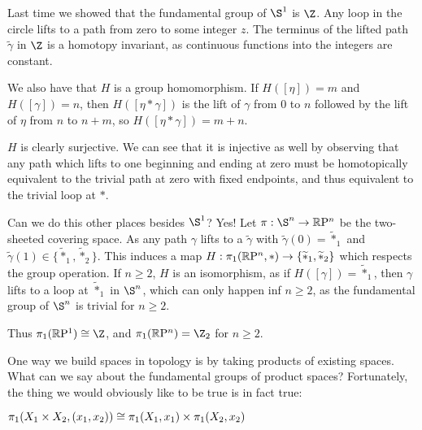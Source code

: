 
Last time we showed that the fundamental group of $\S^1$ is $\Z$.  Any loop in the circle lifts to a path from zero to some integer $z$.  The terminus of the lifted path $\widetilde{\gamma}$ in $\Z$ is a homotopy invariant, as continuous functions into the integers are constant.

	
We also have that $H$ is a group homomorphism.  If $H([\eta])=m$ and $H([\gamma])=n$, then $H([\eta\ast\gamma])$ is the lift of $\gamma$ from $0$ to $n$ followed by the lift of $\eta$ from $n$ to $n+m$, so $H([\eta\ast\gamma])=m+n$.

$H$ is clearly surjective.  We can see that it is injective as well by observing that any path which lifts to one beginning and ending at zero must be homotopically equivalent to the trivial path at zero with fixed endpoints, and thus equivalent to the trivial loop at $\ast$.

Can we do this other places besides $\S^1$? Yes!  Let $\pi:\S^n\rightarrow \RP^n$ be the two-sheeted covering space.  As any path $\gamma$ lifts to a $\widetilde{\gamma}$ with $\widetilde{\gamma}(0)=\widetilde{\ast}_1$ and $\widetilde{\gamma}(1)\in\{\widetilde{\ast}_1,\widetilde{\ast}_2\}$.  This induces a map $H:\pi_1(\mathbb{R}\mathrm{P}^n,\ast)\rightarrow\{\widetilde{\ast}_1,\widetilde{\ast}_2\}$ which respects the group operation.  If $n\geq 2$, $H$ is an isomorphism, as if $H([\gamma])=\widetilde{\ast}_1$, then $\gamma$ lifts to a loop at $\widetilde{\ast}_1$ in $\S^n$, which can only happen inf $n\geq 2$, as the fundamental group of $\S^n$ is trivial for $n\geq 2$.  

Thus $\pi_1(\RP^1)\iso \Z$, and $\pi_1(\RP^n)=\Z_2$ for $n\geq 2$.

One way we build spaces in topology is by taking products of existing spaces.  What can we say about the fundamental groups of product spaces? Fortunately, the thing we would obviously like to be true is in fact true:

\begin{theorem}
	$\pi_1(X_1\times X_2,(x_1,x_2)) \cong \pi_1(X_1,x_1)\times \pi_1(X_2,x_2)$
\end{theorem}


